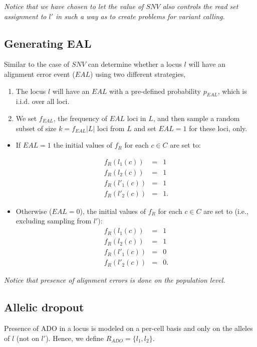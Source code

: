 \documentclass[a4paper,11pt]{article}
\begin{document}
\emph{Notice that we have chosen to let the value of $SNV$ also
  controls the read set assignment to $l'$ in such a way as to create
  problems for variant calling.}

\subsection{Generating EAL}
\label{sec:alignment-error}

Similar to the case of $SNV$ can determine whether a locus $l$ will
have an alignment error event ($EAL$) using two different strategies,
\begin{enumerate}
\item The locus $l$ will have an $EAL$ with a pre-defined probability
  $p_{EAL}$, which is i.i.d. over all loci.
\item We set $f_{EAL}$, the frequency of $EAL$ loci in $L$, and then
  sample a random subset of size  $k=f_{EAL}|L|$ loci from $L$ and set $EAL=1$
  for these loci, only.
\end{enumerate}

\begin{itemize}
\item If $EAL=1$ the initial values of $f_R$ for each $c\in C$ are set
  to:

\begin{eqnarray}
  f_R(l_1(c)) &=& 1\\
  f_R(l_2(c)) &=& 1\\
  f_R(l'_1(c)) &=& 1\\
  f_R(l'_2(c)) &=& 1.
\end{eqnarray}
\item Otherwise ($EAL=0$), the initial values of $f_R$ for each $c\in C$ are
set to (i.e., excluding sampling from $l'$):
\begin{eqnarray}
  f_R(l_1(c)) &=& 1\\
  f_R(l_2(c)) &=& 1\\
  f_R(l'_1(c)) &=& 0\\
  f_R(l'_2(c)) &=& 0.
\end{eqnarray}
\end{itemize}
\emph{Notice that presence of alignment errors is done on the \emph{population level}.}

\subsection{Allelic dropout}
\label{sec:allelic-dropout}

Presence of ADO in a locus is modeled on a per-cell basis and only on
the alleles of $l$ (not on $l'$). Hence, we define
$R_{ADO} = \{l_1,l_2\}$. 
\end{document}

